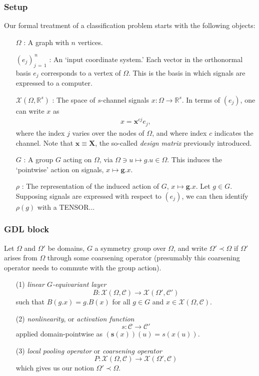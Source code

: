 \documentclass[12pt]{article}
\numberwithin{equation}{section}
\theoremstyle{definition}
\newcommand{		\R		}	{	\mathbb{R}				}
\newcommand{		\cX		}	{	\mathcal{X}				}
\newcommand{		\eq		}[1]	{	\begin{align*}#1\end{align*}	}%
\newcommand{		\Oh		}	{	\Omega					}
\newcommand{		\1		}	{	\bm{1}					}%
\begin{document}
\subsubsection*{Setup} 

Our formal treatment of a classification problem starts with the following objects: 

\begin{itemize}
\item[$\Oh$] : A graph with $n$ vertices. 
\item[$(e_j)_{j\,=\,1}^{\,n}$] : An `input coordinate system.' Each vector in the orthonormal basis $e_j$ corresponds to a vertex of $\Oh$. This is the basis in which signals are expressed to a computer.
\item[$\cX(\Oh,\R^s)$ ] :  The space of $s$-channel signals $x : \Oh \to \R^s$. In terms of $(e_j)$, one can write $x$ as
\eq{
x = \bm{x}^{cj} e_j ,
}
where the index $j$ varies over the nodes of $\Oh$, and where index $c$ indicates the channel. Note that $\bm{x} \equiv \bm{X}$, the so-called \emph{design matrix} previously introduced. 
\item[$G$] : A group $G$ acting on $\Oh$, via $\Oh \ni u \mapsto g.u \in \Oh$. This induces the `pointwise' action on signals, $x \mapsto \bm{g}.x$. 
\item[$\rho$] : The representation of the induced action of $G$, $x \mapsto \bm{g}.x$. Let $g \in G$. Supposing signals are expressed with respect to $(e_j)$, we can then identify $\rho(g)$ with a TENSOR...

\end{itemize}


\subsubsection*{GDL block} 


Let $\Omega$ and $\Omega'$ be domains, $G$ a symmetry group over $\Omega$, and write $\Omega' \prec \Omega$ if $\Omega'$ arises from $\Omega$ through some coarsening operator (presumably this coarsening operator needs to commute with the group action).\\

\begin{enumerate}

\item[(1)] \emph{linear $G$-equivariant layer} 
	$$
	B : \mathcal{X}(\Omega, \mathcal{C}) \to \mathcal{X}(\Omega' , \mathcal{C}')
	$$ 
	such that $B(g.x) = g.B(x)$ for all $g \in G$ and $x \in \mathcal{X}(\Omega, \mathcal{C})$.

\item[(2)] \emph{nonlinearity}, or \emph{activation function} $\quad$ 
	$$
	s : \mathcal{C} \to \mathcal{C}'
	$$ 
	applied domain-pointwise as $(\mathbf{s}(x))(u) = s(x(u))$.

\item[(3)] \emph{local pooling operator} or \emph{coarsening operator} $\quad$ 
	$$
	P : \mathcal{X}(\Omega, \mathcal{C}) \to \mathcal{X}(\Omega', \mathcal{C})
	$$ 
	which gives us our notion $\Omega' \prec \Omega$.

\end{enumerate}
\end{document}
